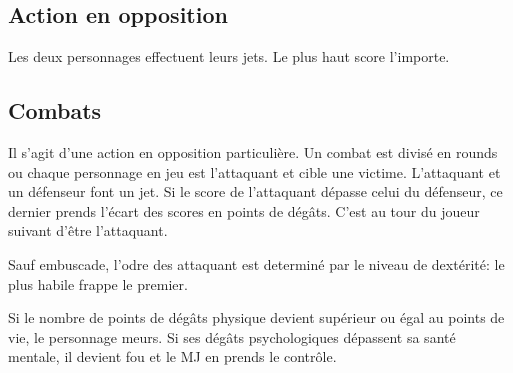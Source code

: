 \subsection{Action en opposition}
Les deux personnages effectuent leurs jets. Le plus haut score l'importe.

\subsection{Combats}
Il s'agit d'une action en opposition particulière. Un combat est divisé en rounds ou chaque personnage en jeu est l’attaquant et cible une victime. 
L’attaquant et un défenseur font un jet. Si le score de l'attaquant dépasse celui du défenseur, ce dernier prends l’écart des scores en points de dégâts. C’est au tour du joueur suivant d’être l’attaquant.

Sauf embuscade, l’odre des attaquant est determiné par le niveau de dextérité: le plus habile frappe le premier.

Si le nombre de points de dégâts physique devient supérieur ou égal au points de vie, le personnage meurs. Si ses dégâts psychologiques dépassent sa santé mentale, il devient fou et le MJ en prends le contrôle.

